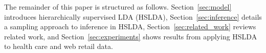The remainder of this paper is structured as follows.   Section~\ref{sec:model}  introduces hierarchically supervised LDA (HSLDA), Section~\ref{sec:inference} details a sampling approach to inference in HSLDA,  Section~\ref{sec:related_work} reviews related work, and Section~\ref{sec:experiments} shows results from applying HSLDA to health care and web retail data.




%


